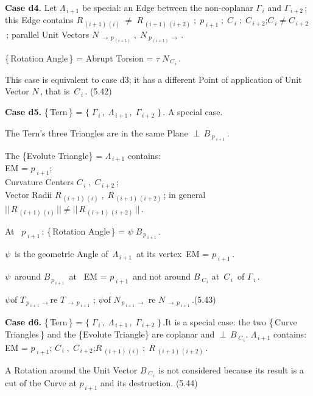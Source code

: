 \documentclass[12pt]{article} %
\begin{document}
{\noindent \textbf{Case d4.} Let $\Lambda_{\,i+1}$ be special: an Edge between the non-coplanar $\Gamma_{\,i}$ and $\Gamma_{\,i+2}$\,; this Edge contains\; $R_{\,(i+1)\,(i)}\;\neq\;R_{\,(i+1)\,(i+2)}\;;\;p_{\;i+1}\;;\;C_{\,i}\;;\;C_{\,i+2}$\;;\;$C_{\,i} \neq C_{\,i+2}$\,;  parallel Unit Vectors \; $N_{\;\to\,p_{\,(i+1)}}\;,\;N_{\;p_{\,(i+1)}\,\to}$\,.

\noindent \{\,Rotation Angle\,\} = Abrupt Torsion = $\tau \;N_{\,C_{\,i}}$\,. 

\noindent This case is equivalent to case d3; it has a different Point of application of Unit Vector $N$\,, that is\, $C_{\,i}$\,. \qquad (5.42)

\noindent \textbf{Case d5.} \{\,Tern\,\} = $\big\{\;\Gamma_{\,i}\,,\;\Lambda_{\,i+1}\,,\;\Gamma_{\,i+2}\;\big\}$\,. A special case.

\noindent The Tern's three Triangles are in the same Plane $\perp\,B_{\;p_{\;i+1}}$\,.

\noindent The \{Evolute Triangle\} = $\Lambda_{\,i+1}$\; contains:\\ EM = $p_{\;i+1}$\;;\\Curvature Centers \;  $C_{\,i}\;,\;C_{\,i+2}$\,;\\ Vector Radii \; $R_{\,(i+1)\,(i)}\;,\;R_{\,(i+1)\,(i+2)}$\,; in general \,$||\,R_{\,(i+1)\,(i)}\,|| \neq ||\,R_{\,(i+1)\,(i+2)}\,||$\,.

\noindent At \, $p_{\;i+1}$\,: \; \{\,Rotation Angle\,\} = $\psi\;B_{\,p_{\;i+1}}$\,.

\noindent $\psi$ \,is the geometric Angle of\, $\Lambda_{\,i+1}$ \,at its vertex \,EM = $p_{\;i+1}$\,.

\noindent $\psi$\, around $B_{\,p_{\;i+1}}$\, at \, EM = $p_{\;i+1}$ \,and not around $B_{\;C_{\,i}}$ at\, $C_{\,i}$ \,of $\Gamma_{\,i}$\,.

\noindent $\psi$\quad of \quad $T_{\,p_{\;i+1}\,\to}$\quad re \quad $T_{\,\to\,p_{\;i+1}}$\; ;\; $\psi$\quad of \quad $N_{\,p_{\;i+1}\,\to}$ \quad re \quad $N_{\,\to\,p_{\;i+1}}$\,.\;(5.43)

\noindent \textbf{Case d6.} \{\,Tern\,\} = $\big\{\;\Gamma_{\,i}\,,\;\Lambda_{\,i+1}\,,\;\Gamma_{\,i+2}\;\big\}$\,.It is a special case: the two \{\,Curve Triangles\,\} and the \{Evolute Triangle\} are coplanar and $\perp\,B_{\;C_{\,i}}$. $\Lambda_{\,i+1}$ contains:\; EM = $p_{\;i+1}$\;;\; $C_{\,i}\;,\;C_{\,i+2}$\;;\;$R_{\;(i+1)\,(i)}\;;\;R_{\;(i+1)\,(i+2)}$\,. 

\noindent A Rotation around the Unit Vector $B_{\;C_{\,i}}$ is not considered because its result is a cut of the Curve at $p_{\,i+1}$ and its destruction. \qquad (5.44)

}
\end{document}
